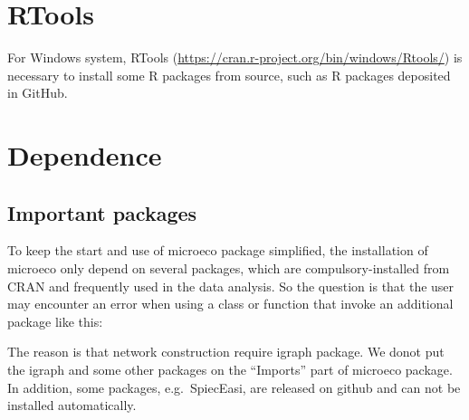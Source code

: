 \documentclass[
]{book}
\newenvironment{Shaded}{\begin{snugshade}}{\end{snugshade}}
\newcommand{\AttributeTok}[1]{\textcolor[rgb]{0.77,0.63,0.00}{#1}}
\newcommand{\FloatTok}[1]{\textcolor[rgb]{0.00,0.00,0.81}{#1}}
\newcommand{\FunctionTok}[1]{\textcolor[rgb]{0.00,0.00,0.00}{#1}}
\newcommand{\NormalTok}[1]{#1}
\newcommand{\OtherTok}[1]{\textcolor[rgb]{0.56,0.35,0.01}{#1}}
\newcommand{\SpecialCharTok}[1]{\textcolor[rgb]{0.00,0.00,0.00}{#1}}
\newcommand{\StringTok}[1]{\textcolor[rgb]{0.31,0.60,0.02}{#1}}
\begin{document}
\hypertarget{rtools}{%
\section{RTools}\label{rtools}}

For Windows system, RTools (\url{https://cran.r-project.org/bin/windows/Rtools/}) is necessary to install some R packages from source, such as R packages deposited in GitHub.

\hypertarget{dependence}{%
\section{Dependence}\label{dependence}}

\hypertarget{important-packages}{%
\subsection{Important packages}\label{important-packages}}

To keep the start and use of microeco package simplified,
the installation of microeco only depend on several packages, which are compulsory-installed from CRAN and frequently used in the data analysis.
So the question is that the user may encounter an error when using a class or function that invoke an additional package like this:

\begin{Shaded}
\end{Shaded}

\begin{Shaded}
\end{Shaded}

The reason is that network construction require igraph package. We donot put the igraph and some other packages on the ``Imports'' part of microeco package.
In addition, some packages, e.g.~SpiecEasi, are released on github and can not be installed automatically.
\end{document}
